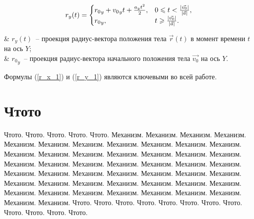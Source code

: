 \begin{equation}\label{r_y_1}
  r_y(t) =
  \begin{cases}
    {r_0}_y + {v_0}_y t + \frac{a_y t^2}{2}, & 0 \leqslant t < \frac{\left|\vec{v_0}\right|}{\left|\vec{a}\right|}, \\
    {r_0}_y,               & t \geqslant \frac{\left|\vec{v_0}\right|}{\left|\vec{a}\right|}.
  \end{cases}
\end{equation}
\begin{Underequation}
  & \(r_y(t)\)~-- проекция радиус-вектора положения тела \(\vec{r}(t)\) в момент времени \(t\) на ось \(Y\); \\
  & \({r_0}_y\)~-- проекция радиус-вектора начального положения тела \(\vec{v_0}\) на ось \(Y\). \\
\end{Underequation}

Формулы (\ref{r_x_1}) и (\ref{r_y_1}) являются ключевыми во всей работе.

\section{Чтото}

Чтото.
Чтото.
Чтото.
Чтото.
Чтото.  Механизм. Механизм. Механизм. Механизм. Механизм.
Механизм. Механизм. Механизм. Механизм. Механизм. Механизм. Механизм. Механизм.
Механизм. Механизм. Механизм. Механизм. Механизм. Механизм. Механизм. Механизм.
Механизм. Механизм. Механизм. Механизм. Механизм. Механизм. Механизм. Механизм.
Механизм. Механизм. Механизм. Механизм. Механизм. Механизм. Механизм. Механизм.
Механизм. Механизм. Механизм. Механизм. Механизм. Механизм. Механизм. Механизм.
Механизм. Механизм. Механизм.
Чтото.
Чтото.
Чтото.
Чтото.
Чтото.
Чтото.
Чтото.
Чтото.
Чтото.
Чтото.
Чтото.
Чтото.